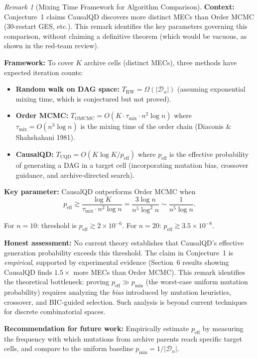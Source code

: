 \documentclass{article}
\theoremstyle{definition}
\theoremstyle{plain}
\theoremstyle{remark}
\newtheorem{remark}{Remark}
\begin{document}
\begin{remark}[Mixing Time Framework for Algorithm Comparison]
\label{rem:mixing_time_comparison}
\textbf{Context:} Conjecture~1 claims CausalQD discovers more distinct MECs than
Order MCMC (30-restart GES, etc.). This remark identifies the key parameters
governing this comparison, without claiming a definitive theorem (which would be
vacuous, as shown in the red-team review).

\textbf{Framework:} To cover $K$ archive cells (distinct MECs), three methods have
expected iteration counts:
\begin{itemize}
  \item \textbf{Random walk on DAG space:} $T_{\text{RW}} = \Omega(|\mathcal{D}_n|)$
    (assuming exponential mixing time, which is conjectured but not proved).
  \item \textbf{Order MCMC:} $T_{\text{OMCMC}} = O(K \cdot \tau_{\text{mix}} \cdot n^2 \log n)$
    where $\tau_{\text{mix}} = O(n^3 \log n)$ is the mixing time of the order chain
    (Diaconis \& Shahshahani 1981).
  \item \textbf{CausalQD:} $T_{\text{CQD}} = O(K \log K / p_{\text{eff}})$ where
    $p_{\text{eff}}$ is the effective probability of generating a DAG in a target cell
    (incorporating mutation bias, crossover guidance, and archive-directed search).
\end{itemize}

\textbf{Key parameter:} CausalQD outperforms Order MCMC when
\begin{equation}
p_{\text{eff}} \gtrsim \frac{\log K}{\tau_{\text{mix}} \cdot n^2 \log n}
= \frac{3\log n}{n^5 \log^2 n} \sim \frac{1}{n^5 \log n}.
\end{equation}

For $n = 10$: threshold is $p_{\text{eff}} \gtrsim 2 \times 10^{-6}$. For $n = 20$:
$p_{\text{eff}} \gtrsim 3.5 \times 10^{-8}$.

\textbf{Honest assessment:} No current theory establishes that CausalQD's effective
generation probability exceeds this threshold. The claim in Conjecture~1 is
\emph{empirical}, supported by experimental evidence (Section~6 results showing
CausalQD finds $1.5\times$ more MECs than Order MCMC). This remark identifies the
theoretical bottleneck: proving $p_{\text{eff}} \gg p_{\min}$ (the worst-case
uniform mutation probability) requires analyzing the \emph{bias} introduced by
mutation heuristics, crossover, and BIC-guided selection. Such analysis is beyond
current techniques for discrete combinatorial spaces.

\textbf{Recommendation for future work:} Empirically estimate $p_{\text{eff}}$ by
measuring the frequency with which mutations from archive parents reach specific
target cells, and compare to the uniform baseline $p_{\min} = 1/|\mathcal{D}_n|$.
\end{remark}
\end{document}
